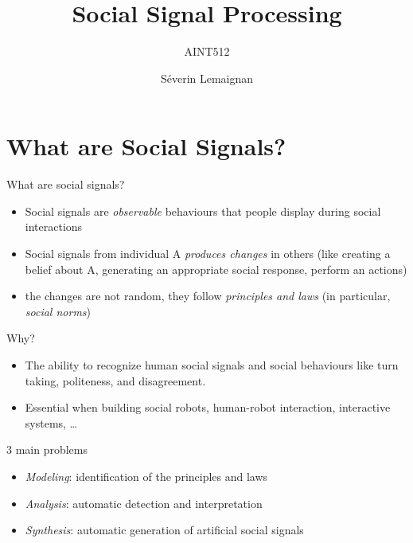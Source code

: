 \documentclass[compress]{beamer}
\title{Social Signal Processing}
\subtitle{AINT512}
\date{}
\author{Séverin Lemaignan}
\institute{Centre for Neural Systems and Robotics\\{\bf Plymouth University}}
\begin{document}

\maketitle

\section[Social signals?]{What are Social Signals?}



{

\begin{frame}{What are social signals?}


    \begin{itemize}
        \item<1-> Social signals are \emph{observable} behaviours that people
            display during social interactions
        \item<2-> Social signals from individual A \emph{produces changes} in others
            (like creating a belief about A, generating an appropriate social
            response, perform an actions)
        \item<3-> the changes are not random, they follow \emph{principles and
            laws} (in particular, \emph{social norms})

    \end{itemize}

\end{frame}
}

\begin{frame}{Why?}
\begin{itemize}

\item The ability to recognize human social signals and social behaviours
  like turn taking, politeness, and disagreement.
\item Essential when building social robots, human-robot interaction,
  interactive systems, \ldots{}
\end{itemize}

    \begin{exampleblock}{3 main problems}

    \begin{itemize}
        \item \emph{Modeling}: identification of the principles and laws
        \item \emph{Analysis}: automatic detection and interpretation
        \item \emph{Synthesis}: automatic generation of artificial social
            signals
    \end{itemize}

    \end{exampleblock}
\end{frame}
\end{document}
